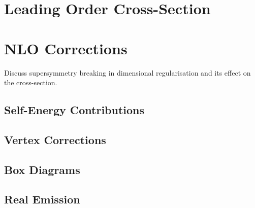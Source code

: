 \documentclass[../main.tex]{subfiles}
\begin{document}



    \section{Leading Order Cross-Section}

    \section{NLO Corrections}
        \begin{TODO}
            \item Discuss supersymmetry breaking in dimensional regularisation and its effect on the cross-section.
        \end{TODO}
        \subsection{Self-Energy Contributions}

        \subsection{Vertex Corrections}

        \subsection{Box Diagrams}

        \subsection{Real Emission}
\end{document}
